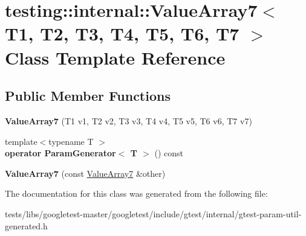 \hypertarget{classtesting_1_1internal_1_1ValueArray7}{}\section{testing\+:\+:internal\+:\+:Value\+Array7$<$ T1, T2, T3, T4, T5, T6, T7 $>$ Class Template Reference}
\label{classtesting_1_1internal_1_1ValueArray7}
\subsection*{Public Member Functions}
\begin{DoxyCompactItemize}
\item 
\mbox{\label{classtesting_1_1internal_1_1ValueArray7_a34570dbbcc50d20f94e4a0c693e42f09}} 
{\bfseries Value\+Array7} (T1 v1, T2 v2, T3 v3, T4 v4, T5 v5, T6 v6, T7 v7)
\item 
\mbox{\label{classtesting_1_1internal_1_1ValueArray7_a4ab41f4a5687896e159c69f581d0a673}} 
{\footnotesize template$<$typename T $>$ }\\{\bfseries operator Param\+Generator$<$ T $>$} () const
\item 
\mbox{\label{classtesting_1_1internal_1_1ValueArray7_ab4be0da0f772c885c6fe681ea486ece4}} 
{\bfseries Value\+Array7} (const \hyperlink{classtesting_1_1internal_1_1ValueArray7}{Value\+Array7} \&other)
\end{DoxyCompactItemize}


The documentation for this class was generated from the following file\+:\begin{DoxyCompactItemize}
\item 
tests/libs/googletest-\/master/googletest/include/gtest/internal/gtest-\/param-\/util-\/generated.\+h\end{DoxyCompactItemize}
